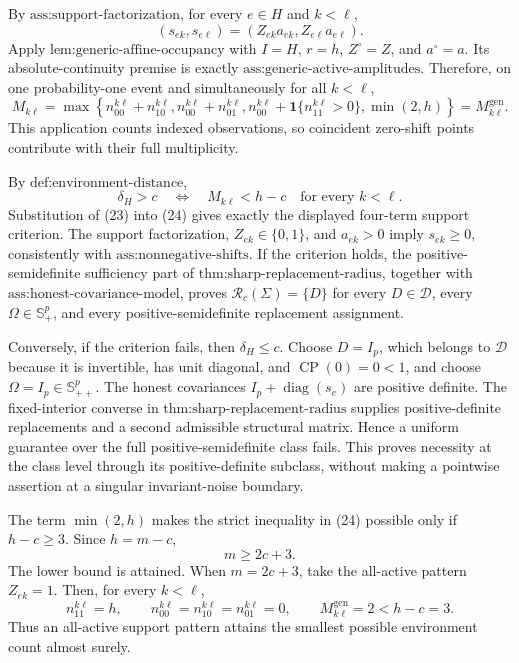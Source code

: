 By \(\text{ass:support-factorization}\), for every \(e\in H\) and \(k<\ell\),
\[
 (s_{ek},s_{e\ell})=(Z_{ek}a_{ek},Z_{e\ell}a_{e\ell}). \tag{22}
\]
Apply \(\text{lem:generic-affine-occupancy}\) with \(I=H\), \(r=h\), \(Z^\circ=Z\), and \(a^\circ=a\).  Its absolute-continuity premise is exactly \(\text{ass:generic-active-amplitudes}\).  Therefore, on one probability-one event and simultaneously for all \(k<\ell\),
\[
 M_{k\ell}
 =\max\!\left\{
 n_{00}^{k\ell}+n_{10}^{k\ell},
 n_{00}^{k\ell}+n_{01}^{k\ell},
 n_{00}^{k\ell}+\mathbf 1\{n_{11}^{k\ell}>0\},
 \min(2,h)
 \right\}
 =M_{k\ell}^{\mathrm{gen}}. \tag{23}
\]
This application counts indexed observations, so coincident zero-shift points contribute with their full multiplicity.

By \(\text{def:environment-distance}\),
\[
 \delta_H>c
 \quad\Longleftrightarrow\quad
 M_{k\ell}<h-c\quad\text{for every }k<\ell. \tag{24}
\]
Substitution of (23) into (24) gives exactly the displayed four-term support criterion.  The support factorization, \(Z_{ek}\in\{0,1\}\), and \(a_{ek}>0\) imply \(s_{ek}\ge0\), consistently with \(\text{ass:nonnegative-shifts}\).  If the criterion holds, the positive-semidefinite sufficiency part of \(\text{thm:sharp-replacement-radius}\), together with \(\text{ass:honest-covariance-model}\), proves \(\mathcal R_c(\Sigma)=\{D\}\) for every \(D\in\mathcal D\), every \(\Omega\in\mathbb S_+^p\), and every positive-semidefinite replacement assignment.

Conversely, if the criterion fails, then \(\delta_H\le c\).  Choose \(D=I_p\), which belongs to \(\mathcal D\) because it is invertible, has unit diagonal, and \(\operatorname{CP}(0)=0<1\), and choose \(\Omega=I_p\in\mathbb S_{++}^p\).  The honest covariances \(I_p+\operatorname{diag}(s_e)\) are positive definite.  The fixed-interior converse in \(\text{thm:sharp-replacement-radius}\) supplies positive-definite replacements and a second admissible structural matrix.  Hence a uniform guarantee over the full positive-semidefinite class fails.  This proves necessity at the class level through its positive-definite subclass, without making a pointwise assertion at a singular invariant-noise boundary.

The term \(\min(2,h)\) makes the strict inequality in (24) possible only if \(h-c\ge3\).  Since \(h=m-c\),
\[
 m\ge2c+3. \tag{25}
\]
The lower bound is attained.  When \(m=2c+3\), take the all-active pattern \(Z_{ek}=1\).  Then, for every \(k<\ell\),
\[
 n_{11}^{k\ell}=h,\qquad
 n_{00}^{k\ell}=n_{10}^{k\ell}=n_{01}^{k\ell}=0,
 \qquad M_{k\ell}^{\mathrm{gen}}=2<h-c=3. \tag{26}
\]
Thus an all-active support pattern attains the smallest possible environment count almost surely.